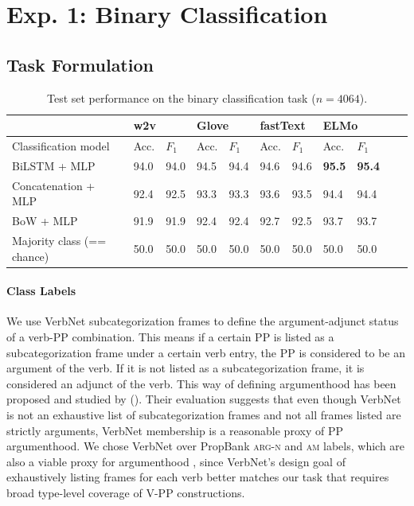 \documentclass[letterpaper]{article} %
\begin{document}
\section{Exp. 1: Binary Classification}

\subsection{Task Formulation}
\label{ex1:data}

\begin{table}[h]
	\centering
	\begin{tabular}{@{}lllllllllll@{}}
		\toprule
		& \multicolumn{2}{l}{w2v} &\multicolumn{2}{l}{Glove}& \multicolumn{2}{l}{fastText} & \multicolumn{2}{l}{ELMo} \\ \midrule
		Classification model       & Acc. & $F_1$ & Acc. & $F_1$ & Acc. & $F_1$ & Acc. & $F_1$   \\ \midrule
		BiLSTM + MLP &   94.0  &  94.0 \hspace{0.8cm} &  94.5 & 94.4 \hspace{0.8cm} & 94.6 & 94.6 \hspace{0.8cm} & \textbf{95.5}& \textbf{95.4} \\
		Concatenation + MLP & 92.4 & 92.5 & 93.3& 93.3& 93.6 & 93.5 & 94.4 & 94.4\\
		BoW + MLP & 91.9& 91.9 & 92.4 &92.4 & 92.7& 92.5& 93.7 & 93.7\\
		Majority class (== chance)       & 50.0      & 50.0 &  50.0 & 50.0  & 50.0 &50.0 & 50.0 & 50.0\\
		\bottomrule
	\end{tabular}
	\caption{Test set performance on the binary classification task  ($n=4064$).}
	\label{ex1:accuracy}
\end{table}

\paragraph{Class Labels} We use VerbNet subcategorization frames to define the argument-adjunct status of a verb-PP combination. This means if a certain PP is listed as a subcategorization frame under a certain verb entry, the PP is considered to be an argument of the verb. If it is not listed as a subcategorization frame, it is considered an adjunct of the verb. This way of defining argumenthood has been proposed and studied by \citeauthor{mcconville2008evaluating} (\citeyear{mcconville2008evaluating}). Their evaluation suggests that even though VerbNet is not an exhaustive list of subcategorization frames and not all frames listed are strictly arguments, VerbNet membership is a reasonable proxy of PP argumenthood. We chose VerbNet over PropBank \textsc{arg-n} and \textsc{am} labels, which are also a viable proxy for argumenthood \cite{abend2010fully}, since VerbNet's design goal of exhaustively listing frames for each verb better matches our task that requires broad type-level coverage of V-PP constructions. %
\end{document}
